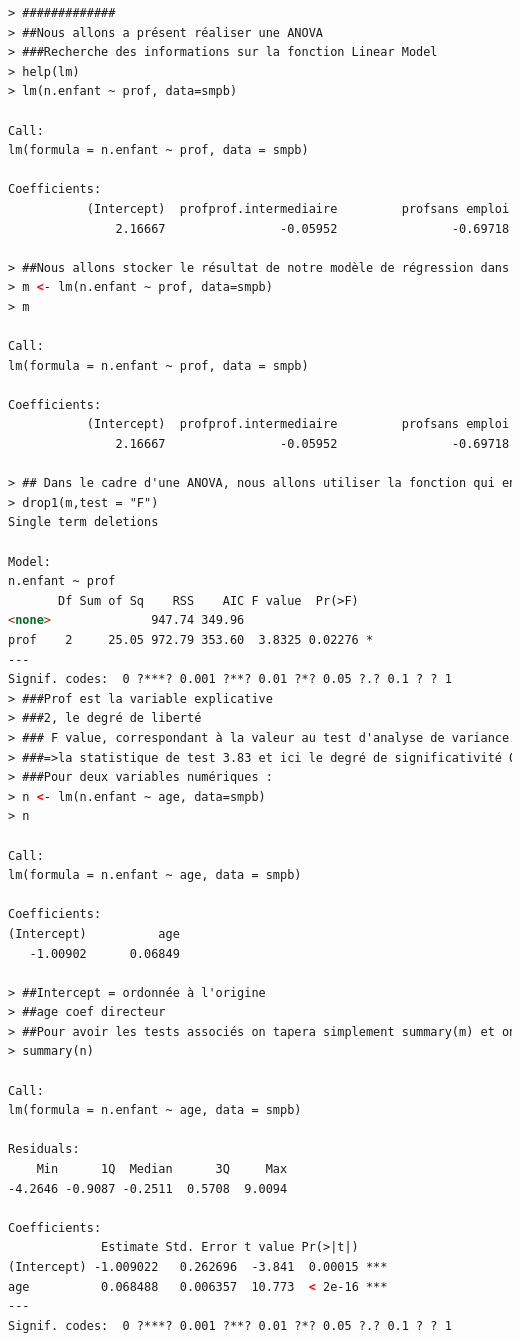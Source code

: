 \begin{lstlisting}[language=html]
> #############
> ##Nous allons a présent réaliser une ANOVA
> ###Recherche des informations sur la fonction Linear Model
> help(lm)
> lm(n.enfant ~ prof, data=smpb)

Call:
lm(formula = n.enfant ~ prof, data = smpb)

Coefficients:
           (Intercept)  profprof.intermediaire         profsans emploi  
               2.16667                -0.05952                -0.69718  

> ##Nous allons stocker le résultat de notre modèle de régression dans la variable m :
> m <- lm(n.enfant ~ prof, data=smpb)
> m

Call:
lm(formula = n.enfant ~ prof, data = smpb)

Coefficients:
           (Intercept)  profprof.intermediaire         profsans emploi  
               2.16667                -0.05952                -0.69718  

> ## Dans le cadre d'une ANOVA, nous allons utiliser la fonction qui en donnant le nom d?une variable et en spécifiant un test de Fisher Snedecor, de fournir un tableau d?analyse de variance,
> drop1(m,test = "F")
Single term deletions

Model:
n.enfant ~ prof
       Df Sum of Sq    RSS    AIC F value  Pr(>F)  
<none>              947.74 349.96                  
prof    2     25.05 972.79 353.60  3.8325 0.02276 *
---
Signif. codes:  0 ?***? 0.001 ?**? 0.01 ?*? 0.05 ?.? 0.1 ? ? 1
> ###Prof est la variable explicative
> ###2, le degré de liberté
> ### F value, correspondant à la valeur au test d'analyse de variance.
> ###=>la statistique de test 3.83 et ici le degré de significativité 0.02.
> ###Pour deux variables numériques :
> n <- lm(n.enfant ~ age, data=smpb)
> n

Call:
lm(formula = n.enfant ~ age, data = smpb)

Coefficients:
(Intercept)          age  
   -1.00902      0.06849  

> ##Intercept = ordonnée à l'origine
> ##age coef directeur
> ##Pour avoir les tests associés on tapera simplement summary(m) et on aura un tableau avec les coefficients de régression et les tests t associés ici pour la pente 10.77 et le degré de significativité.
> summary(n)

Call:
lm(formula = n.enfant ~ age, data = smpb)

Residuals:
    Min      1Q  Median      3Q     Max 
-4.2646 -0.9087 -0.2511  0.5708  9.0094 

Coefficients:
             Estimate Std. Error t value Pr(>|t|)    
(Intercept) -1.009022   0.262696  -3.841  0.00015 ***
age          0.068488   0.006357  10.773  < 2e-16 ***
---
Signif. codes:  0 ?***? 0.001 ?**? 0.01 ?*? 0.05 ?.? 0.1 ? ? 1


\end{lstlisting}
